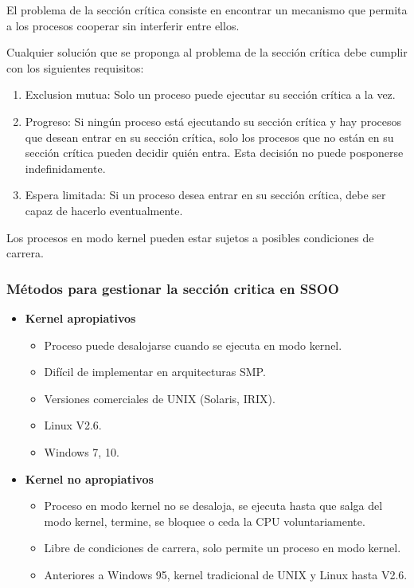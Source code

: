 \documentclass{templateNote}
\begin{document}
El problema de la sección crítica consiste en encontrar un mecanismo que permita a los procesos cooperar sin interferir entre ellos. 

Cualquier solución que se proponga al problema de la sección crítica debe cumplir con los siguientes requisitos:
\begin{enumerate}
    \item Exclusion mutua: Solo un proceso puede ejecutar su sección crítica a la vez.
    \item Progreso: Si ningún proceso está ejecutando su sección crítica y hay procesos que desean entrar en su sección crítica, solo los procesos que no están en su sección crítica pueden decidir quién entra. Esta decisión no puede posponerse indefinidamente.
    \item Espera limitada: Si un proceso desea entrar en su sección crítica, debe ser capaz de hacerlo eventualmente.
\end{enumerate}

Los procesos en modo kernel pueden estar sujetos a posibles condiciones de carrera.

\subsubsection*{Métodos para gestionar la sección critica en SSOO}

\begin{itemize}
    \item \textbf{Kernel apropiativos}
    \begin{itemize}
        \item Proceso puede desalojarse cuando se ejecuta en modo kernel.
        \item Difícil de implementar en arquitecturas SMP.
        \item Versiones comerciales de UNIX (Solaris, IRIX).
        \item Linux V2.6.
        \item Windows 7, 10.
    \end{itemize}
    \item \textbf{Kernel no apropiativos}
    \begin{itemize}
        \item Proceso en modo kernel no se desaloja, se ejecuta hasta que salga del modo kernel, termine, se bloquee o ceda la CPU voluntariamente.
        \item Libre de condiciones de carrera, solo permite un proceso en modo kernel.
        \item Anteriores a Windows 95, kernel tradicional de UNIX y Linux hasta V2.6.
    \end{itemize}
\end{itemize}
\end{document}

